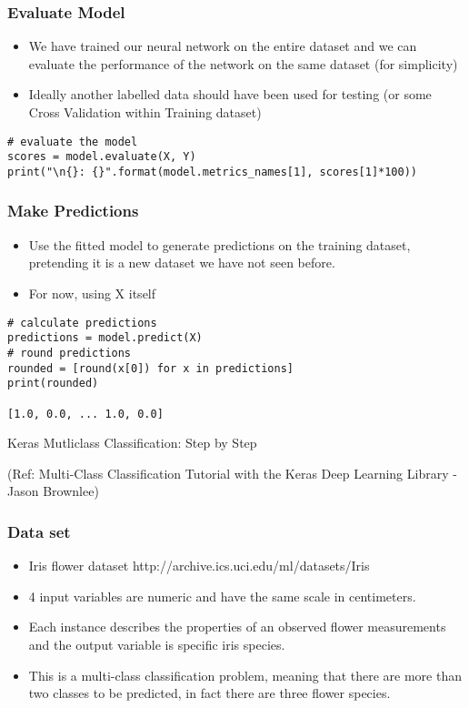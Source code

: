 \begin{frame}[fragile] \frametitle{Evaluate Model}
 \begin{itemize}
\item We have trained our neural network on the entire dataset and we can evaluate the performance of the network on the same dataset (for simplicity)
\item Ideally another labelled data should have been used for testing (or some Cross Validation within Training dataset)
\end{itemize}
\begin{lstlisting}
# evaluate the model
scores = model.evaluate(X, Y)
print("\n{}: {}".format(model.metrics_names[1], scores[1]*100))
\end{lstlisting}
\end{frame}

\begin{frame}[fragile] \frametitle{Make Predictions}
 \begin{itemize}
\item Use the fitted model to generate predictions on the training dataset, pretending it is a new dataset we have not seen before.
\item For now, using X itself
\end{itemize}
\begin{lstlisting}
# calculate predictions
predictions = model.predict(X)
# round predictions
rounded = [round(x[0]) for x in predictions]
print(rounded)

[1.0, 0.0, ... 1.0, 0.0]
\end{lstlisting}
\end{frame}


\begin{frame}
  \begin{center}
    {\Large Keras Mutliclass Classification: Step by Step}
    
    \tiny{(Ref:  Multi-Class Classification Tutorial with the Keras Deep Learning Library - Jason Brownlee)}
  \end{center}
\end{frame}


\begin{frame}[fragile] \frametitle{Data set}
 \begin{itemize}
 \item  Iris flower dataset http://archive.ics.uci.edu/ml/datasets/Iris
 \item  4 input variables are numeric and have the same scale in centimeters. 
 \item Each instance describes the properties of an observed flower measurements and the output variable is specific iris species.
 \item This is a multi-class classification problem, meaning that there are more than two classes to be predicted, in fact there are three flower species.
\end{itemize}
\end{frame}


